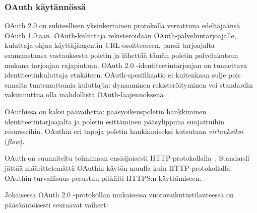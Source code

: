 \documentclass[finnish,gradu]{tktltiki}
\begin{document}
  \subsubsection{OAuth käytännössä} %
  \label{ssub:oauth_käytännössä}

  OAuth 2.0 on suhteellisen yksinkertainen protokolla verrattuna edeltäjäänsä OAuth 1.0:aan. OAuth-kuluttaja rekisteröidään OAuth-palveluntarjoajalle, kuluttaja ohjaa käyttäjäagentin URL-osoitteeseen, parsii tarjoajalta saamanstansa vastauksesta poletin ja lähettää tämän poletin palvelukutsun mukana tarjoajan rajapintaan. OAuth 2.0 -identiteetintarjoajan on tunnettava identiteetinkuluttaja etukäteen. OAuth-spesifikaatio ei kuitenkaan sulje pois ennalta tuntemattomia kuluttajia: dynaaminen rekisteröityminen voi standardin vakiinnuttua olla mahdollista OAuth-laajennoksena~\cite{ietf_oauth2_unregistered_clients}.

  OAuthissa on kaksi päävaihetta: pääsyoikeuspoletin hankkiminen identiteetintarjoajalta ja poletin esittäminen pääsylippuna suojattuihin resursseihin. OAuthin eri tapoja poletin hankkimiseksi kutsutaan \emph{virtauksiksi} (\emph{flow}).
  \cite{hueniverse_oauth_intro}

  OAuth on suunniteltu toimimaan ensisijaisesti HTTP-protokollalla~\cite{ietf_oauth2}.
  Standardi jättää määrittelemättä OAuthin käytön muulla kuin HTTP-protokollalla.
  OAuthin turvallisuus perustuu pitkälti HTTPS:n käyttämiseen.


  Jokaisessa OAuth 2.0 -protokollan mukaisessa vuorovaikutustilanteessa on pääsääntöisesti seuraavat vaiheet:
\end{document}
